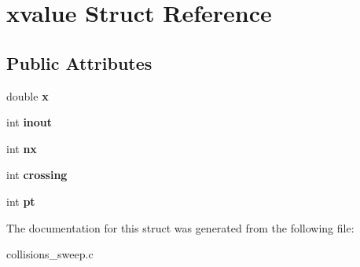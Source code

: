 \hypertarget{structxvalue}{
\section{xvalue Struct Reference}
\label{structxvalue}
}
\subsection*{Public Attributes}
\begin{DoxyCompactItemize}
\item 
\hypertarget{structxvalue_a932034498a262a8dbe76cf7ccb4564ea}{
double {\bfseries x}}
\label{structxvalue_a932034498a262a8dbe76cf7ccb4564ea}

\item 
\hypertarget{structxvalue_a3da15f862d89435ea04fce0dcb8ba867}{
int {\bfseries inout}}
\label{structxvalue_a3da15f862d89435ea04fce0dcb8ba867}

\item 
\hypertarget{structxvalue_a120f1ff0906fb937924acf39c51ca5d0}{
int {\bfseries nx}}
\label{structxvalue_a120f1ff0906fb937924acf39c51ca5d0}

\item 
\hypertarget{structxvalue_a095b35466073fb4de1ee6866b2dbba51}{
int {\bfseries crossing}}
\label{structxvalue_a095b35466073fb4de1ee6866b2dbba51}

\item 
\hypertarget{structxvalue_a0549512d71385b7b47ba522b40ae0538}{
int {\bfseries pt}}
\label{structxvalue_a0549512d71385b7b47ba522b40ae0538}

\end{DoxyCompactItemize}


The documentation for this struct was generated from the following file:\begin{DoxyCompactItemize}
\item 
collisions\_\-sweep.c\end{DoxyCompactItemize}
